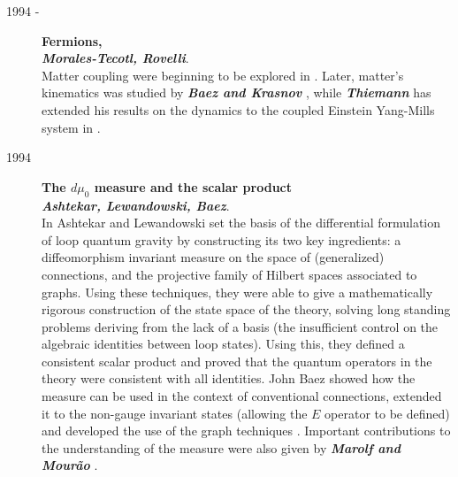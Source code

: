 \documentclass[12pt]{article}
\begin{document}
\begin{description}
	\item[1994 -] {\bf  Fermions,\\
	{\em Morales-Tecotl, Rovelli}}.\\  
	Matter coupling were beginning to be explored in 
	\cite{MoralesRovelli,MoralesRovelli2}.  Later, matter's kinematics 
	was studied by \textbf{\em Baez and Krasnov} 
	\cite{KrasnovMatter,BaezKrasnov}, while \textbf{\em Thiemann\/} 
	has extended his results on the dynamics to the coupled Einstein 
	Yang-Mills system in \cite{ThiemannYM}.

	\item[1994] {\bf  The $d\mu_{0}$ measure and the scalar product\\
	{\em Ashtekar, Lewandowski, Baez}}.\\  
	In \cite{AshtekarLewandowski,AshtekarLewandowski3,AshtekarLewandowski2} 
	Ashtekar and Lewandowski set the basis of the differential 
	formulation of loop quantum gravity by constructing its two key 
	ingredients: a diffeomorphism invariant measure on the space of 
	(generalized) connections, and the projective family of Hilbert 
	spaces associated to graphs.  Using these techniques, they were 
	able to give a mathematically rigorous construction of the state 
	space of the theory, solving long standing problems deriving from 
	the lack of a basis (the insufficient control on the algebraic 
	identities between loop states).  Using this, they defined a 
	consistent scalar product and proved that the quantum operators in 
	the theory were consistent with all identities.  John Baez showed 
	how the measure can be used in the context of conventional 
	connections, extended it to the non-gauge invariant states 
	(allowing the $E$ operator to be defined) and developed the use of 
	the graph techniques \cite{Baez94a,Baez93,Baez2}.  Important 
	contributions to the understanding of the measure were also given 
	by \textbf{\em Marolf and Mour\~ao} \cite{MarolfMourao}.
	

\end{description}
\end{document}
